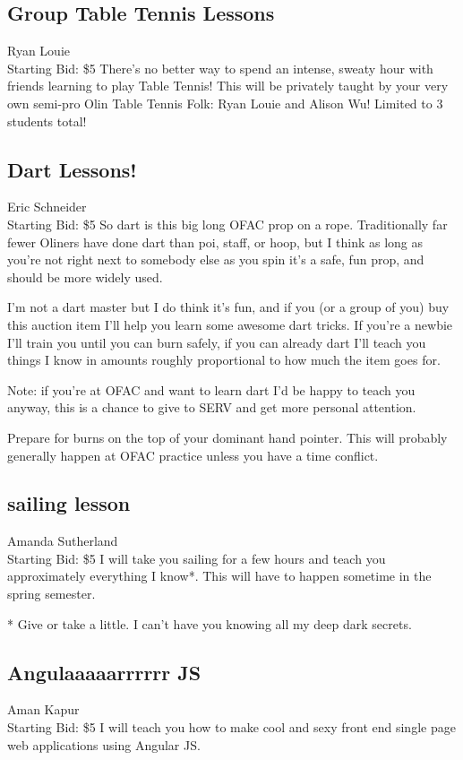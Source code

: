 \documentclass[11pt]{article}
\begin{document}
\subsection{Group Table Tennis Lessons}
Ryan Louie
\\
Starting Bid: \$5
\newline
There's no better way to spend an intense, sweaty hour with friends learning to play Table Tennis!   This will be privately taught by your very own semi-pro Olin Table Tennis Folk: Ryan Louie and Alison Wu!
Limited to 3 students total!
\subsection{Dart Lessons!}
Eric Schneider
\\
Starting Bid: \$5
\newline
So dart is this big long OFAC prop on a rope. Traditionally far fewer Oliners have done dart than poi, staff, or hoop, but I think as long as you're not right next to somebody else as you spin it's a safe, fun prop, and should be more widely used.

I'm not a dart master but I do think it's fun, and if you (or a group of you) buy this auction item I'll help you learn some awesome dart tricks. If you're a newbie I'll train you until you can burn safely, if you can already dart I'll teach you things I know in amounts roughly proportional to how much the item goes for.

Note: if you're at OFAC and want to learn dart I'd be happy to teach you anyway, this is a chance to give to SERV and get more personal attention.

Prepare for burns on the top of your dominant hand pointer. This will probably generally happen at OFAC practice unless you have a time conflict.
\subsection{sailing lesson}
Amanda Sutherland
\\
Starting Bid: \$5
\newline
I will take you sailing for a few hours and teach you approximately everything I know*. This will have to happen sometime in the spring semester. 


* Give or take a little. I can't have you knowing all my deep dark secrets.
\subsection{Angulaaaaarrrrrr JS}
Aman Kapur
\\
Starting Bid: \$5
\newline
I will teach you how to make cool and sexy front end single page web applications using Angular JS. 
\end{document}
